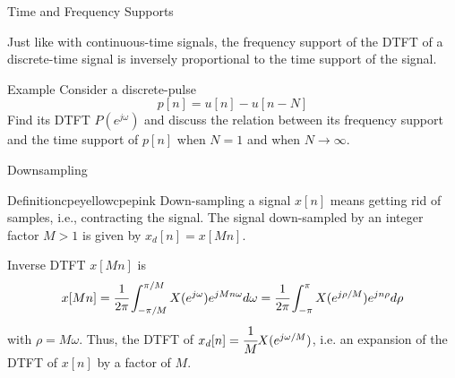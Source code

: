 \documentclass[aspectratio=169,xcolor=dvipsnames,svgnames,x11names,fleqn]{beamer}
\begin{document}
\begin{frame}{Time and Frequency Supports}

\Large
    \begin{center}
        Just like with continuous-time signals, the frequency support of the DTFT of a discrete-time signal is inversely proportional to the time support of the signal.
    \end{center}
\end{frame}

\begin{frame}{Example}
    Consider a discrete-pulse
    $$
    p[n] = u[n] - u[n-N]
    $$
    Find its DTFT $P(e^{j\omega})$ and discuss the relation between its frequency support and the time support of $p[n]$ when $N = 1$ and when $N \to \infty$.
\end{frame}

\begin{frame}{}
\vspace*{-9\baselineskip}
    \color{LightGray}{Blank space for calculation}
\end{frame}
\begin{frame}{}
\vspace*{-9\baselineskip}
    \color{LightGray}{Blank space for calculation}
\end{frame}
\begin{frame}{}
\vspace*{-9\baselineskip}
    \color{LightGray}{Blank space for calculation}
\end{frame}
\begin{frame}{}
\vspace*{-9\baselineskip}
    \color{LightGray}{Blank space for calculation}
\end{frame}
\begin{frame}{}
\vspace*{-9\baselineskip}
    \color{LightGray}{Blank space for calculation}
\end{frame}

\begin{frame}{Downsampling}
\small
\begin{custombox}{Definition}{cpeyellow}{cpepink}
    Down-sampling a signal $x[n]$ means getting rid of samples, i.e., contracting the signal. The signal down-sampled by an integer factor $M > 1$ is given by
    $
    x_d[n] = x[Mn]
    $.
\end{custombox}

Inverse DTFT $x[Mn]$ is
$$
x[Mn] = \cfrac{1}{2\pi} \int_{-\pi/M}^{\pi/M} X(e^{j\omega}) e^{jMn\omega} d\omega = \cfrac{1}{2\pi} \int_{-\pi}^{\pi} X(e^{j\rho/M}) e^{jn\rho} d\rho
$$
with $\rho = M\omega$. Thus, the DTFT of $x_d[n] = \cfrac{1}{M}X(e^{j\omega/M})$, i.e. an expansion of the DTFT of $x[n]$ by a factor of $M$.
\end{frame}
\end{document}
